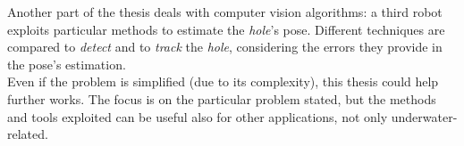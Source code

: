 \begin{abstracts}
Another part of the thesis deals with computer vision algorithms: a third robot exploits  particular methods to estimate the \textit{hole}'s pose. Different techniques are compared to \textit{detect} and to \textit{track} the \textit{hole}, considering the errors they provide in the pose's estimation.\\
Even if the problem is simplified (due to its complexity), this thesis could help further works. The focus is on the particular problem stated, but the methods and tools exploited can be useful also for other applications, not only underwater-related. 

\end{abstracts}

\restoregeometry